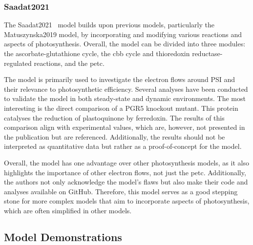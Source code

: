 \subsubsection{Saadat2021}
The Saadat2021~\cite{saadatComputationalAnalysisAlternative2021} model builds upon previous models, particularly the Matuszynska2019 model, by incorporating and modifying various reactions and aspects of photosynthesis. Overall, the model can be divided into three modules: the ascorbate-glutathione cycle, the \gls{cbb} cycle and thioredoxin reductase-regulated reactions, and the \gls{petc}.

The model is primarily used to investigate the electron flows around PSI and their relevance to photosynthetic efficiency. Several analyses have been conducted to validate the model in both steady-state and dynamic environments. The most interesting is the direct comparison of a PGR5 knockout mutant. This protein catalyses the reduction of plastoquinone by ferredoxin. The results of this comparison align with experimental values, which are, however, not presented in the publication but are referenced. Additionally, the results should not be interpreted as quantitative data but rather as a proof-of-concept for the model.

Overall, the model has one advantage over other photosynthesis models, as it also highlights the importance of other electron flows, not just the \gls{petc}. Additionally, the authors not only acknowledge the model's flaws but also make their code and analyses available on GitHub. Therefore, this model serves as a good stepping stone for more complex models that aim to incorporate aspects of photosynthesis, which are often simplified in other models.

\subsection{Model Demonstrations}\label{sec:model-demonstrations}

